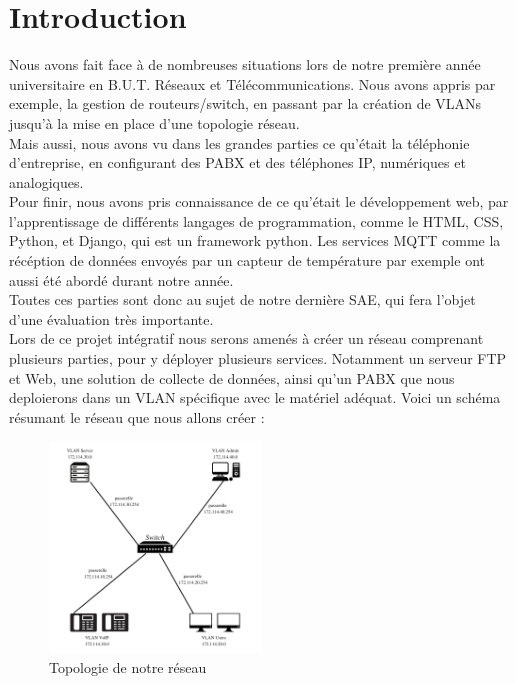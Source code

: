 \documentclass[12pt, a4paper]{article}
\begin{document}
\section*{Introduction}
Nous avons fait face à de nombreuses situations lors de notre première année
universitaire en B.U.T. Réseaux et Télécommunications. Nous avons appris 
par exemple, la gestion de routeurs/switch, en passant par la création de 
VLANs jusqu'à la mise en place d'une topologie réseau.\\ 
Mais aussi, nous avons vu dans les grandes parties ce qu'était la téléphonie
d'entreprise, en configurant des PABX et des téléphones IP, numériques et
analogiques.\\
Pour finir, nous avons pris connaissance de ce qu'était le développement 
web, par l'apprentissage de différents langages de programmation, comme
le HTML, CSS, Python, et Django, qui est un framework python. Les services
MQTT comme la récéption de données envoyés par un capteur de température 
par exemple ont aussi été abordé durant notre année.\\

Toutes ces parties sont donc au sujet de notre dernière SAE, qui fera l'objet
d'une évaluation très importante.\\

Lors de ce projet intégratif nous serons amenés à créer un réseau comprenant
plusieurs parties, pour y déployer plusieurs services. Notamment un serveur 
FTP et Web, une solution de collecte de données, ainsi qu'un PABX
que nous deploierons dans un VLAN spécifique avec le matériel adéquat.
Voici un schéma résumant le réseau que nous allons créer :
\begin{figure}[H]
    \centering
    \includegraphics[width=0.5\textwidth]{img/topologie.png}
    \caption{Topologie de notre réseau}
    \label{fig:topologie}
\end{figure}
\end{document}
